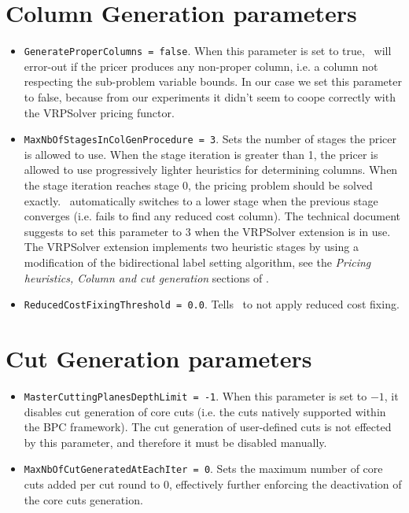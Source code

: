 \section{Column Generation parameters}

\begin{itemize}
	\item \texttt{GenerateProperColumns = false}.
	      When this parameter is set to true, \bapcod\ will error-out if the pricer produces any non-proper column,
	      i.e. a column not respecting the sub-problem variable bounds.
	      In our case we set this parameter to false, because from our experiments it didn't seem to coope correctly with the VRPSolver pricing functor.
	\item \texttt{MaxNbOfStagesInColGenProcedure = 3}.
	      Sets the number of stages the pricer is allowed to use.
	      When the stage iteration is greater than 1, the pricer is allowed to use
	      progressively lighter heuristics for determining columns.
	      When the stage iteration reaches stage 0, the pricing problem should be solved exactly.
	      \bapcod\ automatically switches to a lower stage when the previous stage converges (i.e. fails to find any reduced cost column).
	      The technical document suggests to set this parameter to $3$ when the VRPSolver extension is in use.
	      The VRPSolver extension implements two heuristic stages by using a modification of the bidirectional label setting algorithm, see the \textit{Pricing heuristics, Column and cut generation} sections of \textcite{sadykov2021a}.
	\item \texttt{ReducedCostFixingThreshold = 0.0}.
	      Tells \bapcod\ to not apply reduced cost fixing.
\end{itemize}

\section{Cut Generation parameters}
\begin{itemize}
	\item \texttt{MasterCuttingPlanesDepthLimit = -1}.
	      When this parameter is set to $-1$, it disables cut generation of core cuts
	      (i.e. the cuts natively supported within the BPC framework).
	      The cut generation of user-defined cuts
	      is not effected by this parameter, and therefore it must be disabled manually.
	\item \texttt{MaxNbOfCutGeneratedAtEachIter = 0}.
	      Sets the maximum number of core cuts added per cut round to $0$,
	      effectively further enforcing the deactivation of the core cuts generation.
\end{itemize}

